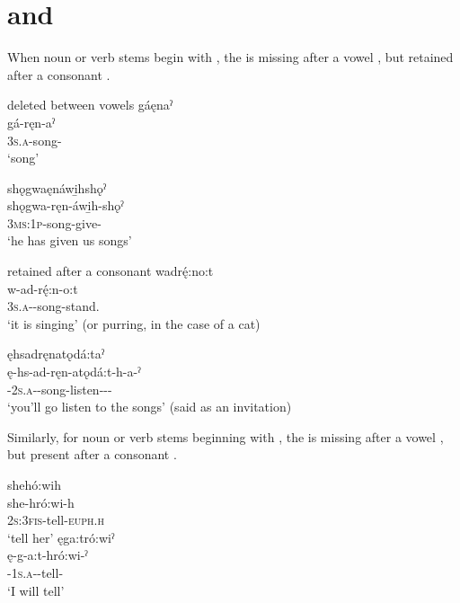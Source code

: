 \section{ and } \label{R and HR}
When noun or verb stems begin with , the  is missing after a vowel , but retained after a consonant .

\ea\label{ex:rdelex}  deleted between vowels
\ea gáęnaˀ\\
\gll gá-ręn-aˀ\\
 \textsc{3s.a}-song-{\nsf}\\
\glt `song'

\ex shǫgwaęnáwi̱hshǫˀ\\
\gll shǫgwa-ręn-áwi̱h-shǫˀ\\
\textsc{3ms:1p}-song-give-{\pluralizer}\\
\glt `he has given us songs'
\z
\z

\ea\label{ex:rdelex2}  retained after a consonant
\ea wadrę́:no:t\\
\gll w-ad-rę́:n-o:t\\
\textsc{3s.a}-{\semireflexive}-song-stand.{\stative}\\
\glt ‘it is singing’ (or purring, in the case of a cat)

\ex ęhsadręnatǫdá:taˀ\\
\gll ę-hs-ad-ręn-atǫdá:t-h-a-ˀ\\
\fut-\textsc{2s.a}-{\semireflexive}-song-listen-{\dislocative}-{\joinerA}-{\punctual}\\
\glt ‘you’ll go listen to the songs’ (said as an invitation)
\z
\z

Similarly, for noun or verb stems beginning with , the  is missing after a vowel , but present after a consonant . 

\ea\label{ex:rdelex3}
\ea shehó:wih\\\label{ex:rdelex3a}
\gll she-hró:wi-h\\
\textsc{2s:3fis}-tell-\textsc{euph.h}\\
\glt `tell her'
\ex ęga:tró:wiˀ\\\label{ex:rdelex3b}
\gll ę-g-a:t-hró:wi-ˀ\\
 \fut-\textsc{1s.a}-{\semireflexive}-tell-{\punctual}\\
\glt `I will tell'
\z
\z

